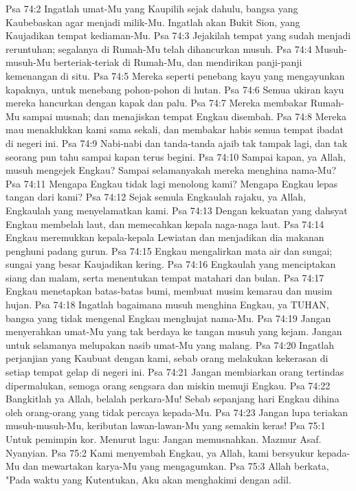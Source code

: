 Psa 74:2  Ingatlah umat-Mu yang Kaupilih sejak dahulu, bangsa yang Kaubebaskan agar menjadi milik-Mu. Ingatlah akan Bukit Sion, yang Kaujadikan tempat kediaman-Mu.
Psa 74:3  Jejakilah tempat yang sudah menjadi reruntuhan; segalanya di Rumah-Mu telah dihancurkan musuh.
Psa 74:4  Musuh-musuh-Mu berteriak-teriak di Rumah-Mu, dan mendirikan panji-panji kemenangan di situ.
Psa 74:5  Mereka seperti penebang kayu yang mengayunkan kapaknya, untuk menebang pohon-pohon di hutan.
Psa 74:6  Semua ukiran kayu mereka hancurkan dengan kapak dan palu.
Psa 74:7  Mereka membakar Rumah-Mu sampai musnah; dan menajiskan tempat Engkau disembah.
Psa 74:8  Mereka mau menaklukkan kami sama sekali, dan membakar habis semua tempat ibadat di negeri ini.
Psa 74:9  Nabi-nabi dan tanda-tanda ajaib tak tampak lagi, dan tak seorang pun tahu sampai kapan terus begini.
Psa 74:10  Sampai kapan, ya Allah, musuh mengejek Engkau? Sampai selamanyakah mereka menghina nama-Mu?
Psa 74:11  Mengapa Engkau tidak lagi menolong kami? Mengapa Engkau lepas tangan dari kami?
Psa 74:12  Sejak semula Engkaulah rajaku, ya Allah, Engkaulah yang menyelamatkan kami.
Psa 74:13  Dengan kekuatan yang dahsyat Engkau membelah laut, dan memecahkan kepala naga-naga laut.
Psa 74:14  Engkau meremukkan kepala-kepala Lewiatan dan menjadikan dia makanan penghuni padang gurun.
Psa 74:15  Engkau mengalirkan mata air dan sungai; sungai yang besar Kaujadikan kering.
Psa 74:16  Engkaulah yang menciptakan siang dan malam, serta menentukan tempat matahari dan bulan.
Psa 74:17  Engkau menetapkan batas-batas bumi, membuat musim kemarau dan musim hujan.
Psa 74:18  Ingatlah bagaimana musuh menghina Engkau, ya TUHAN, bangsa yang tidak mengenal Engkau menghujat nama-Mu.
Psa 74:19  Jangan menyerahkan umat-Mu yang tak berdaya ke tangan musuh yang kejam. Jangan untuk selamanya melupakan nasib umat-Mu yang malang.
Psa 74:20  Ingatlah perjanjian yang Kaubuat dengan kami, sebab orang melakukan kekerasan di setiap tempat gelap di negeri ini.
Psa 74:21  Jangan membiarkan orang tertindas dipermalukan, semoga orang sengsara dan miskin memuji Engkau.
Psa 74:22  Bangkitlah ya Allah, belalah perkara-Mu! Sebab sepanjang hari Engkau dihina oleh orang-orang yang tidak percaya kepada-Mu.
Psa 74:23  Jangan lupa teriakan musuh-musuh-Mu, keributan lawan-lawan-Mu yang semakin keras!
Psa 75:1  Untuk pemimpin kor. Menurut lagu: Jangan memusnahkan. Mazmur Asaf. Nyanyian.
Psa 75:2  Kami menyembah Engkau, ya Allah, kami bersyukur kepada-Mu dan mewartakan karya-Mu yang mengagumkan.
Psa 75:3  Allah berkata, "Pada waktu yang Kutentukan, Aku akan menghakimi dengan adil.

